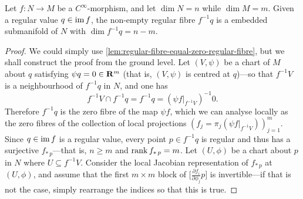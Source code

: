 \begin{theorem}
\label{thm:regular-fibre-theorem}
Let \(f: N \to M\) be a \(C^{\infty}\)-morphism, and let \(\dim N = n\) while
\(\dim M = m\). Given a regular value \(q \in \operatorname{im} f\), the non-empty regular
fibre \(f^{-1} q\) is a embedded submanifold of \(N\) with
\(\dim f^{-1} q = n - m\).
\end{theorem}

\begin{proof}
We could simply use \cref{lem:regular-fibre-equal-zero-regular-fibre}, but we
shall construct the proof from the ground level. Let \((V, \psi)\) be a chart of
\(M\) about \(q\) satisfying \(\psi q = 0 \in \mathbf{R}^m\) (that is, \((V, \psi)\) is
centred at \(q\))---so that \(f^{-1} V\) is a neighbourhood of \(f^{-1} q\) in
\(N\), and one has
\[
f^{-1} V \cap f^{-1} q = f^{-1} q = (\psi f|_{f^{-1} V})^{-1} 0.
\]
Therefore \(f^{-1} q\) is the zero fibre of the map \(\psi f\), which we can
analyse locally as the zero fibres of the collection of local projections
\((f_j = \pi_j (\psi f|_{f^{-1} V}))_{j=1}^m\). Since \(q \in \operatorname{im} f\) is a regular value,
every point \(p \in f^{-1} q\) is regular and thus has a surjective
\(f_{*\, p}\)---that is, \(n \geq m\) and \(\operatorname{rank} f_{*\, p} = m\). Let
\((U, \phi)\) be a chart about \(p\) in \(N\) where \(U \subseteq f^{-1} V\).
Consider the local Jacobian representation of \(f_{*\, p}\) at \((U, \phi)\),
and assume that the first \(m \times m\) block of
\(\big[ \frac{\partial f_i}{\partial \phi_j} p \big]\) is invertible---if that
is not the case, simply rearrange the indices so that this is true.


\end{proof}
